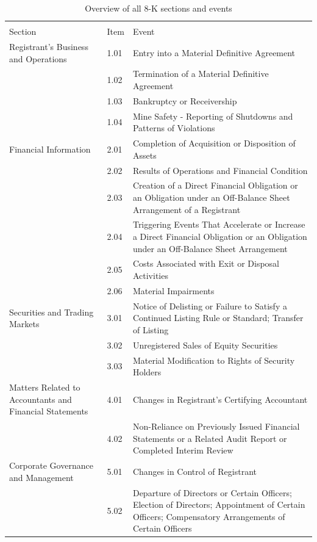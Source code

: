 \documentclass{article}
\begin{document}
	
	
	
	
	\begin{table}[h!]
	\centering
	\caption{Overview of all 8-K sections and events}
	\label{table:8kevents}
	
	\begin{tabu} to \textwidth {|X[1]|l|X[2]|}
		\toprule
		&      &                                   \\
		Section & Item & Event \\
		\midrule
		Registrant's Business and Operations & 1.01 & Entry into a Material Definitive Agreement \\
		& 1.02 & Termination of a Material Definitive Agreement \\
		& 1.03 & Bankruptcy or Receivership \\
		& 1.04 & Mine Safety - Reporting of Shutdowns and Patterns of Violations \\
		Financial Information & 2.01 & Completion of Acquisition or Disposition of Assets \\
		& 2.02 & Results of Operations and Financial Condition \\
		& 2.03 & Creation of a Direct Financial Obligation or an Obligation under an Off-Balance Sheet Arrangement of a Registrant \\
		& 2.04 & Triggering Events That Accelerate or Increase a Direct Financial Obligation or an Obligation under an Off-Balance Sheet Arrangement \\
		& 2.05 & Costs Associated with Exit or Disposal Activities \\
		& 2.06 & Material Impairments \\
		Securities and Trading Markets & 3.01 & Notice of Delisting or Failure to Satisfy a Continued Listing Rule or Standard; Transfer of Listing \\
		& 3.02 & Unregistered Sales of Equity Securities \\
		& 3.03 & Material Modification to Rights of Security Holders \\
		Matters Related to Accountants and Financial Statements & 4.01 & Changes in Registrant's Certifying Accountant \\
		& 4.02 & Non-Reliance on Previously Issued Financial Statements or a Related Audit Report or Completed Interim Review \\
		Corporate Governance and Management & 5.01 & Changes in Control of Registrant \\
		& 5.02 & Departure of Directors or Certain Officers; Election of Directors; Appointment of Certain Officers; Compensatory Arrangements of Certain Officers \\

\end{tabu}
\end{table}
\end{document}
